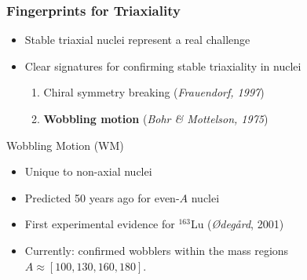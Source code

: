 \documentclass{beamer}
\begin{document}
\begin{frame}
  \frametitle{Fingerprints for Triaxiality}
  \begin{itemize}
    \item Stable triaxial nuclei represent a real challenge
    \item Clear signatures for confirming stable triaxiality in nuclei
    \begin{enumerate}
      \item Chiral symmetry breaking (\textit{Frauendorf, 1997})
      \item \textbf{Wobbling motion} (\textit{Bohr \& Mottelson, 1975})
    \end{enumerate}
  \end{itemize}
  \begin{block}{Wobbling Motion (WM)}
    \begin{itemize}
      \item Unique to non-axial nuclei
      \item Predicted 50 years ago for even-$A$ nuclei
      \item First experimental evidence for $^{163}$Lu (\textit{Ødegård}, 2001)
      \item Currently: confirmed wobblers within the mass regions $A\approx[100,130,160,180]$.
    \end{itemize}
  \end{block}
\end{frame}

\end{document}
